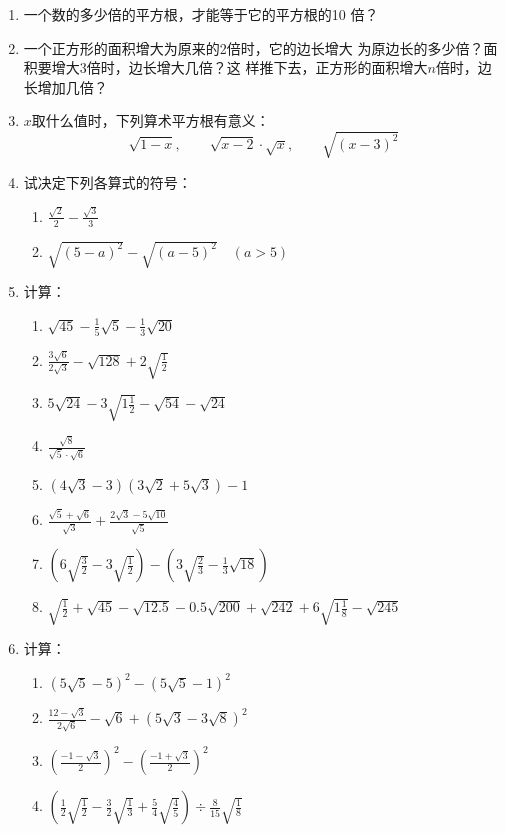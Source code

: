 \begin{enumerate}
\item 一个数的多少倍的平方根，才能等于它的平方根的10
倍？
\item 一个正方形的面积增大为原来的2倍时，它的边长增大
为原边长的多少倍？面积要增大3倍时，边长增大几倍？这
样推下去，正方形的面积增大$n$倍时，边长增加几倍？
\item $x$取什么值时，下列算术平方根有意义：
\[\sqrt{1-x},\qquad \sqrt{x-2}\cdot \sqrt{x},\qquad \sqrt{(x-3)^2}  \]

\item 试决定下列各算式的符号：
\begin{enumerate}
    \item $\frac{\sqrt{2}}{2}-\frac{\sqrt{3}}{3}$
    \item $\sqrt{(5-a)^2}-\sqrt{(a-5)^2} \quad (a>5)$
\end{enumerate}

\item 计算：
\begin{enumerate}
    \item $\sqrt{45}-\frac{1}{5}\sqrt{5}-\frac{1}{3}\sqrt{20}$
    \item $\frac{3\sqrt{6}}{2\sqrt{3}}-\sqrt{128}+2\sqrt{\frac{1}{2}}$
    \item $5\sqrt{24}-3\sqrt{1\frac{1}{2}}-\sqrt{54}-\sqrt{24}$
    \item $\frac{\sqrt{8}}{\sqrt{5}\cdot \sqrt{6}}$
    \item $\left(4\sqrt{3}-3\right)\left(3\sqrt{2}+5\sqrt{3}\right)-1$
    \item $\frac{\sqrt{5}+\sqrt{6}}{\sqrt{3}}+\frac{2\sqrt{3}-5\sqrt{10}}{\sqrt{5}}$
    \item $\left(6\sqrt{\frac{3}{2}}-3\sqrt{\frac{1}{2}}\right)-\left(3\sqrt{\frac{2}{3}}-\frac{1}{3}\sqrt{18}\right)$
    \item $\sqrt{\frac{1}{2}}+\sqrt{45}-\sqrt{12.5}-0.5\sqrt{200}+\sqrt{242}+6\sqrt{1\frac{1}{8}}-\sqrt{245}$
\end{enumerate}

\item 计算：
\begin{enumerate}
    \item $\left(5\sqrt{5}-5\right)^2-\left(5\sqrt{5}-1\right)^2$
    \item $\frac{12-\sqrt{3}}{2\sqrt{6}}-\sqrt{6}+\left(5\sqrt{3}-3\sqrt{8}\right)^2$
    \item $\left(\frac{-1-\sqrt{3}}{2}\right)^2-\left(\frac{-1+\sqrt{3}}{2}\right)^2$
    \item $\left(\frac{1}{2}\sqrt{\frac{1}{2}}-\frac{3}{2}\sqrt{\frac{1}{3}}+\frac{5}{4}\sqrt{\frac{4}{5}}\right)\div \frac{8}{15}\sqrt{\frac{1}{8}}$


\end{enumerate}
\end{enumerate}
